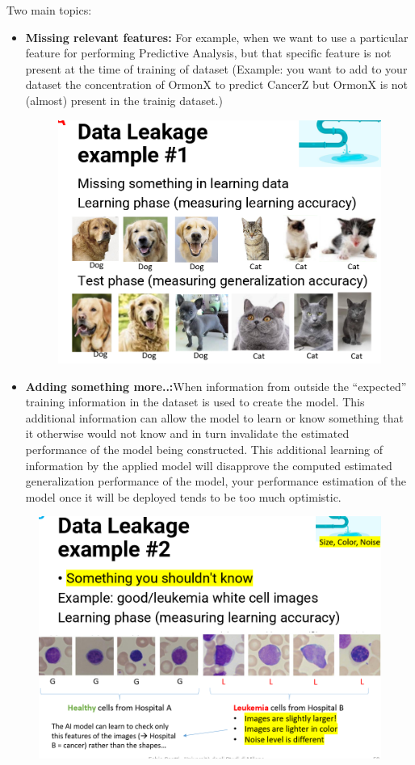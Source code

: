 \noindent Two main topics:
\begin{itemize}
    \item \textbf{Missing relevant features: }For example, when we want to use a particular feature for performing Predictive Analysis, but that specific feature is 
    not present at the time of training of dataset (Example: you want to add to your dataset the concentration of OrmonX to predict CancerZ but OrmonX is not (almost) present in the trainig dataset.)
    \begin{figure}[H]
        \centering
        \includegraphics[width=0.8\linewidth]{07-08/images/cani e gatti.png}
    \end{figure}
    \item \textbf{Adding something more..:}When information from outside the “expected” training information in the dataset is used to create the model. This additional information can allow the model to learn or know something that it otherwise would not know and in turn invalidate the estimated performance of the model being constructed.
    This additional learning of information by the applied model will disapprove the computed estimated generalization performance of the model, your performance estimation of the model once it will be deployed tends to be too much optimistic.
\end{itemize}
\begin{figure}[H]
    \centering
    \includegraphics[width=0.8\linewidth]{07-08/images/leucemia.png}
\end{figure}

